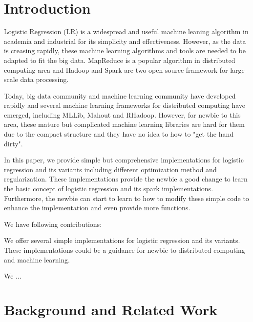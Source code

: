 \documentclass[sigconf]{acmart}
\begin{document}
\section{Introduction}
\label{sec:introduction}

Logistic Regression (LR) is a widespread and useful machine leaning algorithm in academia and industrial for its simplicity and effectiveness. However, as the data is creasing rapidly, these machine learning algorithms and tools are needed to be adapted to fit the big data. MapReduce is a popular algorithm in distributed computing area and Hadoop and Spark are two open-source framework for large-scale data processing. 

Today, big data community and machine learning community have developed rapidly and several machine learning frameworks for distributed computing have emerged, including MLLib, Mahout and RHadoop. However, for newbie to this area, these mature but complicated machine learning libraries are hard for them due to the compact structure and they have no idea to how to "get the hand dirty". 

In this paper, we provide simple but comprehensive implementations for logistic regression and its variants including different optimization method and regularization. These implementations provide the newbie a good change to learn the basic concept of logistic regression and its spark implementations. Furthermore, the newbie can start to learn to how to modify these simple code to enhance the implementation and even provide more functions. 

We have following contributions:

We offer several simple implementations for logistic regression and its variants. These implementations could be a guidance for newbie to distributed computing and machine learning. 

We ...



\section{Background and Related Work}
\label{sec:relatedWork}
\end{document}
